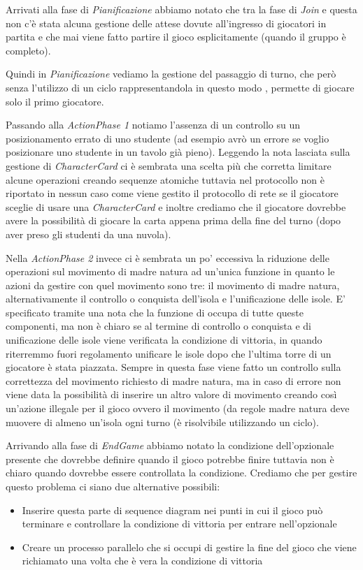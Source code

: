 \documentclass[12pt]{article}
\begin{document}
	Arrivati alla fase di \emph{Pianificazione} abbiamo notato che tra la fase di \emph{Join} e questa non c’è stata alcuna gestione delle attese dovute all’ingresso di giocatori in partita e che mai viene fatto partire il gioco esplicitamente (quando il gruppo è completo).
	
	Quindi in \emph{Pianificazione} vediamo la gestione del passaggio di turno, che però senza l’utilizzo di un ciclo rappresentandola in questo modo , permette di giocare solo il primo giocatore.
	
	Passando alla \emph{ActionPhase 1} notiamo l’assenza di un controllo su un posizionamento errato di uno studente (ad esempio avrò un errore se voglio posizionare uno studente in un tavolo già pieno). 
	Leggendo la nota lasciata sulla gestione di \emph{CharacterCard} ci è sembrata una scelta più che corretta limitare alcune operazioni creando sequenze atomiche tuttavia nel protocollo non è riportato in nessun caso come viene gestito il protocollo di rete se il giocatore sceglie di usare una \emph{CharacterCard} e inoltre crediamo che il giocatore dovrebbe avere la possibilità di giocare la carta appena prima della fine del turno (dopo aver preso gli studenti da una nuvola).
	
	Nella \emph{ActionPhase 2} invece ci è sembrata un po’ eccessiva la riduzione delle operazioni sul movimento di madre natura ad un’unica funzione in quanto le azioni da gestire con quel movimento sono tre: il movimento di madre natura, alternativamente il controllo o conquista dell’isola e l’unificazione delle isole. E’ specificato tramite una nota che la funzione di occupa di tutte queste componenti, ma non è chiaro se al termine di controllo o conquista e di unificazione delle isole viene verificata la condizione di vittoria, in quando riterremmo fuori regolamento unificare le isole dopo che l’ultima torre di un giocatore è stata piazzata.
	Sempre in questa fase viene fatto un controllo sulla correttezza del movimento richiesto di madre natura, ma in caso di errore non viene data la possibilità di inserire un altro valore di movimento creando così un’azione illegale per il gioco ovvero il movimento (da regole madre natura deve muovere di almeno un’isola ogni turno (è risolvibile utilizzando un ciclo).
	
	Arrivando alla fase di \emph{EndGame} abbiamo notato la condizione dell’opzionale presente che dovrebbe definire quando il gioco potrebbe finire tuttavia non è chiaro quando dovrebbe essere controllata la condizione. Crediamo che per gestire questo problema ci siano due alternative possibili:
	\begin{itemize}
		\item Inserire questa parte di sequence diagram nei punti in cui il gioco può terminare e controllare la condizione di vittoria per entrare nell’opzionale
		\item Creare un processo parallelo che si occupi di gestire la fine del gioco che viene richiamato una volta che è vera la condizione di vittoria
	\end{itemize}
	
\end{document}

